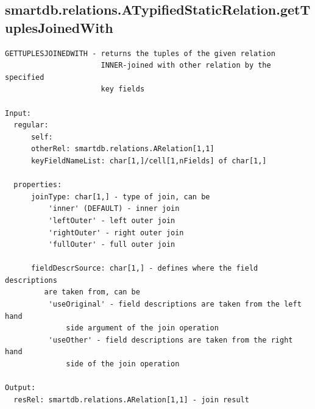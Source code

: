 \documentclass[letterpaper,10pt,english]{sphinxmanual}
\begin{document}
\subsection{smartdb.relations.ATypifiedStaticRelation.getTuplesJoinedWith}
\label{chap_functions:smartdb-relations-atypifiedstaticrelation-gettuplesjoinedwith}
\begin{Verbatim}[commandchars=\\\{\}]
GETTUPLESJOINEDWITH - returns the tuples of the given relation
                      INNER-joined with other relation by the specified
                      key fields

Input:
  regular:
      self:
      otherRel: smartdb.relations.ARelation[1,1]
      keyFieldNameList: char[1,]/cell[1,nFields] of char[1,]

  properties:
      joinType: char[1,] - type of join, can be
          'inner' (DEFAULT) - inner join
          'leftOuter' - left outer join
          'rightOuter' - right outer join
          'fullOuter' - full outer join

      fieldDescrSource: char[1,] - defines where the field descriptions
         are taken from, can be
          'useOriginal' - field descriptions are taken from the left hand
              side argument of the join operation
          'useOther' - field descriptions are taken from the right hand
              side of the join operation

Output:
  resRel: smartdb.relations.ARelation[1,1] - join result
\end{Verbatim}
\end{document}
